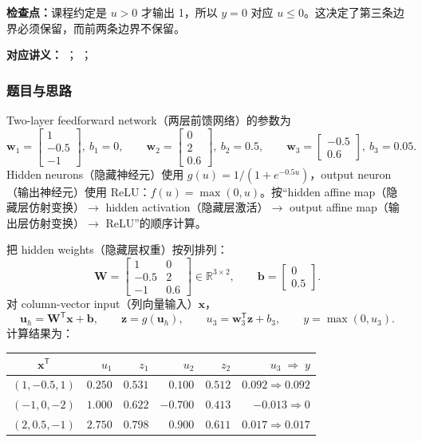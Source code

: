 \textbf{检查点：}课程约定是 $u>0$ 才输出 1，所以 $y=0$ 对应 $u\le0$。这决定了第三条边界必须保留，而前两条边界不保留。


\textbf{对应讲义：}
；
；

\subsubsection*{题目与思路}

Two-layer feedforward network（两层前馈网络）的参数为
\[
  \bm w_1=\begin{bmatrix}1\\-0.5\\-1\end{bmatrix},\ b_1=0,
  \qquad
  \bm w_2=\begin{bmatrix}0\\2\\0.6\end{bmatrix},\ b_2=0.5,
  \qquad
  \bm w_3=\begin{bmatrix}-0.5\\0.6\end{bmatrix},\ b_3=0.05.
\]
Hidden neurons（隐藏神经元）使用 $g(u)=1/(1+e^{-0.5u})$，output neuron（输出神经元）使用 ReLU：$f(u)=\max(0,u)$。按“hidden affine map（隐藏层仿射变换）$\to$ hidden activation（隐藏层激活）$\to$ output affine map（输出层仿射变换）$\to$ ReLU”的顺序计算。

\begin{checkedsolution}
把 hidden weights（隐藏层权重）按列排列：
\[
  \bm W=
  \begin{bmatrix}
    1&0\\
    -0.5&2\\
    -1&0.6
  \end{bmatrix}\in\mathbb R^{3\times2},
  \qquad
  \bm b=\begin{bmatrix}0\\0.5\end{bmatrix}.
\]
对 column-vector input（列向量输入）$\bm x$，
\[
  \bm u_h=\bm W^{\mathsf T}\bm x+\bm b,\qquad
  \bm z=g(\bm u_h),\qquad
  u_3=\bm w_3^{\mathsf T}\bm z+b_3,\qquad
  y=\max(0,u_3).
\]
计算结果为：
\begin{center}
\small
\begin{tabular}{@{}c@{\quad}rrrrr@{}}
  \toprule
  $\bm x^{\mathsf T}$ & $u_1$ & $z_1$ & $u_2$ & $z_2$ & $u_3\;\Rightarrow\;y$ \\
  \midrule
  $(1,-0.5,1)$ & $0.250$ & $0.531$ & $0.100$ & $0.512$ & $0.092\Rightarrow0.092$ \\
  $(-1,0,-2)$  & $1.000$ & $0.622$ & $-0.700$ & $0.413$ & $-0.013\Rightarrow0$ \\
  $(2,0.5,-1)$ & $2.750$ & $0.798$ & $0.900$ & $0.611$ & $0.017\Rightarrow0.017$ \\
  \bottomrule
\end{tabular}
\end{center}
\end{checkedsolution}

